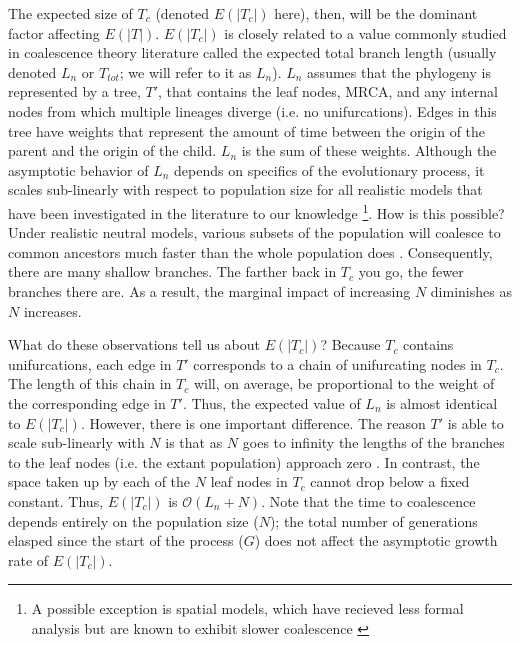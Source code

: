 The expected size of $T_c$ (denoted $E(|T_c|)$ here), then, will be the dominant factor affecting $E(|T|)$.
$E(|T_c|)$ is closely related to a value commonly studied in coalescence theory literature called the expected total branch length (usually denoted $L_n$ or $T_{tot}$; we will refer to it as $L_n$).
$L_n$ assumes that the phylogeny is represented by a tree, $T'$, that contains the leaf nodes, MRCA, and any internal nodes from which multiple lineages diverge (i.e. no unifurcations).
Edges in this tree have weights that represent the amount of time between the origin of the parent and the origin of the child.
$L_n$ is the sum of these weights.
Although the asymptotic behavior of $L_n$ depends on specifics of the evolutionary process, it scales sub-linearly with respect to population size for all realistic models that have been investigated in the literature to our knowledge \citep{gnedinLcoalescentsSurvey2014} \footnote{A possible exception is spatial models, which have recieved less formal analysis but are known to exhibit slower coalescence \citep{berestyckiRecentProgressCoalescent2009}}.  
How is this possible?
Under realistic neutral models, various subsets of the population will coalesce to common ancestors much faster than the whole population does \citep{nordborgCoalescentTheory2019}.
Consequently, there are many shallow branches.
The farther back in $T_c$ you go, the fewer branches there are.
As a result, the marginal impact of increasing $N$ diminishes as $N$ increases.

What do these observations tell us about $E(|T_c|)$?
Because $T_c$ contains unifurcations, each edge in $T'$ corresponds to a chain of unifurcating nodes in $T_c$.
The length of this chain in $T_c$ will, on average, be proportional to the weight of the corresponding edge in $T'$.
Thus, the expected value of $L_n$ is almost identical to $E(|T_c|)$.
However, there is one important difference.
The reason $T'$ is able to scale sub-linearly with $N$ is that as $N$ goes to infinity the lengths of the branches to the leaf nodes (i.e. the extant population) approach zero \citep{nordborgCoalescentTheory2019, delmasAsymptoticResultsLength2008, drmotaAsymptoticResultsConcerning2007}.
In contrast, the space taken up by each of the $N$ leaf nodes in $T_c$ cannot drop below a fixed constant.
Thus, $E(|T_c|)$ is $\mathcal{O}(L_n + N)$.
Note that the time to coalescence depends entirely on the population size ($N$); the total number of generations elasped since the start of the process ($G$) does not affect the asymptotic growth rate of $E(|T_c|)$.

